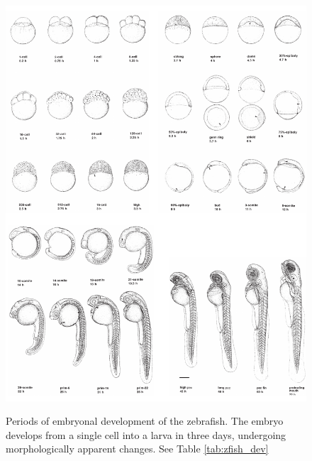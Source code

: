 \begin{figure}
  \centering
  \includegraphics{Chapters/tweezers/Figs/PDF/zebrafish_stages}
  \label{fig:zebrafish_stages}
  \caption{Periods of embryonal development of the zebrafish.
  The embryo develops from a single cell into a larva in three days, undergoing morphologically apparent changes.
  See Table \ref{tab:zfish_dev}
  }
\end{figure}

